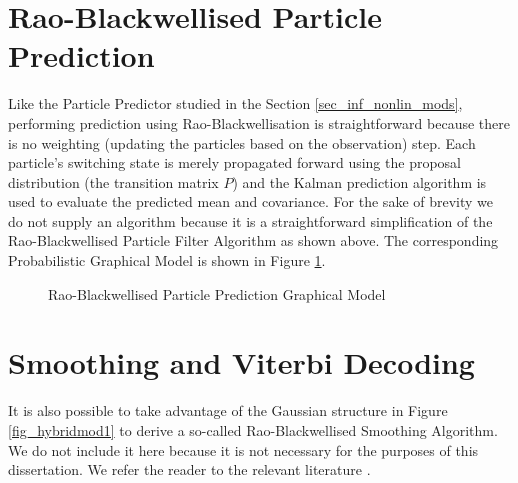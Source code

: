 \section{Rao-Blackwellised Particle Prediction}
\label{sec_inf_rbpf_pred}
Like the Particle Predictor studied in the Section \ref{sec_inf_nonlin_mods}, performing prediction using Rao-Blackwellisation is straightforward because there is no weighting (updating the particles based on the observation) step. Each particle's switching state is merely propagated forward using the proposal distribution (the transition matrix $P$) and the Kalman prediction algorithm is used to evaluate the predicted mean and covariance. For the sake of brevity we do not supply an algorithm because it is a straightforward simplification of the Rao-Blackwellised Particle Filter Algorithm as shown above. The corresponding Probabilistic Graphical Model is shown in Figure \ref{fig_hybridmod1_prediction}.
\begin{figure}[H] 
\centering
{}
\caption{Rao-Blackwellised Particle Prediction Graphical Model}
\label{fig_hybridmod1_prediction}
\end{figure}

\section{Smoothing and Viterbi Decoding}
It is also possible to take advantage of the Gaussian structure in Figure \ref{fig_hybridmod1} to derive a so-called Rao-Blackwellised Smoothing Algorithm. We do not include it here because it is not necessary for the purposes of this dissertation. We refer the reader to the relevant literature \cite{chen}\cite{doucet}. 

